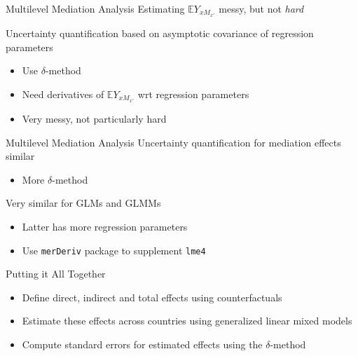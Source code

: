 \documentclass[14pt]{beamer}
\newcommand{\bE}{\mathbb{E}}
\begin{document}
\begin{frame}{Multilevel Mediation Analysis}
    Estimating $\bE Y_{xM_{x'}}$ messy, but not \textit{hard}\newline

    Uncertainty quantification based on asymptotic covariance of regression parameters
    \begin{itemize}
        \item Use $\delta$-method
        \item Need derivatives of $\bE Y_{xM_{x'}}$ wrt regression parameters
        \item Very messy, not particularly hard
    \end{itemize}

\end{frame}

\begin{frame}{Multilevel Mediation Analysis}
    Uncertainty quantification for mediation effects similar
    \begin{itemize}
        \item More $\delta$-method \newline
    \end{itemize}

    Very similar for GLMs and GLMMs
    \begin{itemize}
        \item Latter has more regression parameters
        \item Use \texttt{merDeriv} package to supplement \texttt{lme4}
    \end{itemize}

\end{frame}


\begin{frame}{Putting it All Together}
    \begin{itemize}
        \item Define direct, indirect and total effects using counterfactuals \newline

        \item Estimate these effects across countries using generalized linear mixed models \newline

        \item Compute standard errors for estimated effects using the $\delta$-method

    \end{itemize}

\end{frame}
\end{document}
